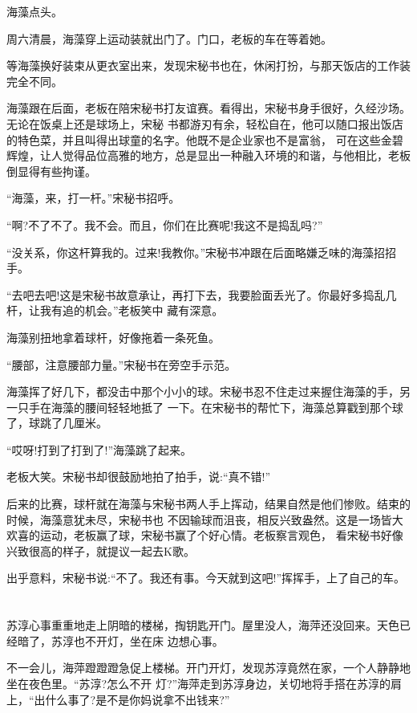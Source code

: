 \documentclass[11pt,a4paper,onecolumn]{article}
\begin{document}
海藻点头。

周六清晨，海藻穿上运动装就出门了。门口，老板的车在等着她。

等海藻换好装束从更衣室出来，发现宋秘书也在，休闲打扮，与那天饭店的工作装完全不同。

海藻跟在后面，老板在陪宋秘书打友谊赛。看得出，宋秘书身手很好，久经沙场。无论在饭桌上还是球场上，宋秘
书都游刃有余，轻松自在，他可以随口报出饭店的特色菜，并且叫得出球童的名字。他既不是企业家也不是富翁，
可在这些金碧辉煌，让人觉得品位高雅的地方，总是显出一种融入环境的和谐，与他相比，老板倒显得有些拘谨。

``海藻，来，打一杆。''宋秘书招呼。

``啊?不了不了。我不会。而且，你们在比赛呢!我这不是捣乱吗?''

``没关系，你这杆算我的。过来!我教你。''宋秘书冲跟在后面略嫌乏味的海藻招招手。

``去吧去吧!这是宋秘书故意承让，再打下去，我要脸面丢光了。你最好多捣乱几杆，让我有追的机会。''老板笑中
藏有深意。

海藻别扭地拿着球杆，好像拖着一条死鱼。

``腰部，注意腰部力量。''宋秘书在旁空手示范。

海藻挥了好几下，都没击中那个小小的球。宋秘书忍不住走过来握住海藻的手，另一只手在海藻的腰间轻轻地抵了
一下。在宋秘书的帮忙下，海藻总算戳到那个球了，球跳了几厘米。

``哎呀!打到了打到了!''海藻跳了起来。

老板大笑。宋秘书却很鼓励地拍了拍手，说:``真不错!''

后来的比赛，球杆就在海藻与宋秘书两人手上挥动，结果自然是他们惨败。结束的时候，海藻意犹未尽，宋秘书也
不因输球而沮丧，相反兴致盎然。这是一场皆大欢喜的运动，老板赢了球，宋秘书赢了个好心情。老板察言观色，
看宋秘书好像兴致很高的样子，就提议一起去K歌。

出乎意料，宋秘书说:``不了。我还有事。今天就到这吧!''挥挥手，上了自己的车。

\section[\thesection]{}

苏淳心事重重地走上阴暗的楼梯，掏钥匙开门。屋里没人，海萍还没回来。天色已经暗了，苏淳也不开灯，坐在床
边想心事。

不一会儿，海萍蹬蹬蹬急促上楼梯。开门开灯，发现苏淳竟然在家，一个人静静地坐在夜色里。``苏淳?怎么不开
灯?''海萍走到苏淳身边，关切地将手搭在苏淳的肩上，``出什么事了?是不是你妈说拿不出钱来?''
\end{document}
